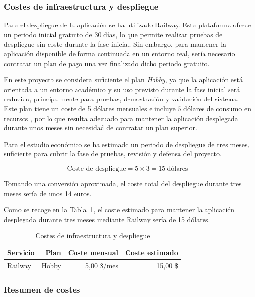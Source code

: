 \subsubsection{Costes de infraestructura y despliegue}

Para el despliegue de la aplicación se ha utilizado Railway. Esta plataforma ofrece un periodo inicial gratuito de 30 días, lo que permite realizar pruebas de despliegue sin coste durante la fase inicial. Sin embargo, para mantener la aplicación disponible de forma continuada en un entorno real, sería necesario contratar un plan de pago una vez finalizado dicho periodo gratuito.

En este proyecto se considera suficiente el plan \textit{Hobby}, ya que la aplicación está orientada a un entorno académico y su uso previsto durante la fase inicial será reducido, principalmente para pruebas, demostración y validación del sistema. Este plan tiene un coste de 5 dólares mensuales e incluye 5 dólares de consumo en recursos \cite{railwayPricing}, por lo que resulta adecuado para mantener la aplicación desplegada durante unos meses sin necesidad de contratar un plan superior.

Para el estudio económico se ha estimado un periodo de despliegue de tres meses, suficiente para cubrir la fase de pruebas, revisión y defensa del proyecto.

\[
\text{Coste de despliegue} = 5 \times 3 = 15\ \text{dólares}
\]

Tomando una conversión aproximada, el coste total del despliegue durante tres meses sería de unos 14 euros.

Como se recoge en la Tabla~\ref{tab:costes-infraestructura}, el coste estimado para mantener la aplicación desplegada durante tres meses mediante Railway sería de 15 dólares.

\begin{table}[H]
	\centering
	\begin{tabular}{l r r r}
		\toprule
		\textbf{Servicio} & \textbf{Plan} & \textbf{Coste mensual} & \textbf{Coste estimado} \\
		\midrule
		Railway & Hobby & 5,00 \$/mes & 15,00 \$ \\
		\bottomrule
	\end{tabular}
	\caption{Costes de infraestructura y despliegue}
	\label{tab:costes-infraestructura}
\end{table}

\subsubsection{Resumen de costes}

